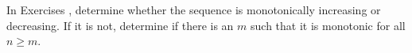 {\noindent In Exercises}
{, determine whether the sequence is monotonically increasing or decreasing. If it is not, determine if there is an $m$ such that it is monotonic for all $n\geq m$.}
